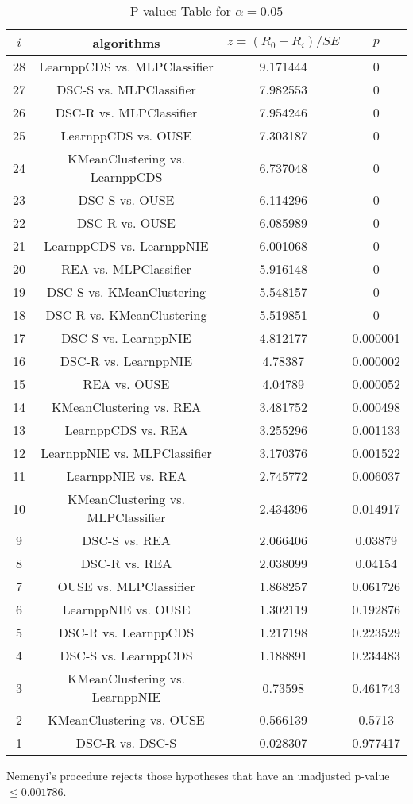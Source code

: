 \documentclass[a4paper,10pt]{article}
\begin{document}
\begin{landscape}
\begin{table}[!htp]
\centering\scriptsize
\begin{tabular}{cccc}
$i$&algorithms&$z=(R_0 - R_i)/SE$&$p$\\
\hline28&LearnppCDS vs. MLPClassifier&9.171444&0\\
27&DSC-S vs. MLPClassifier&7.982553&0\\
26&DSC-R vs. MLPClassifier&7.954246&0\\
25&LearnppCDS vs. OUSE&7.303187&0\\
24&KMeanClustering vs. LearnppCDS&6.737048&0\\
23&DSC-S vs. OUSE&6.114296&0\\
22&DSC-R vs. OUSE&6.085989&0\\
21&LearnppCDS vs. LearnppNIE&6.001068&0\\
20&REA vs. MLPClassifier&5.916148&0\\
19&DSC-S vs. KMeanClustering&5.548157&0\\
18&DSC-R vs. KMeanClustering&5.519851&0\\
17&DSC-S vs. LearnppNIE&4.812177&0.000001\\
16&DSC-R vs. LearnppNIE&4.78387&0.000002\\
15&REA vs. OUSE&4.04789&0.000052\\
14&KMeanClustering vs. REA&3.481752&0.000498\\
13&LearnppCDS vs. REA&3.255296&0.001133\\
12&LearnppNIE vs. MLPClassifier&3.170376&0.001522\\
11&LearnppNIE vs. REA&2.745772&0.006037\\
10&KMeanClustering vs. MLPClassifier&2.434396&0.014917\\
9&DSC-S vs. REA&2.066406&0.03879\\
8&DSC-R vs. REA&2.038099&0.04154\\
7&OUSE vs. MLPClassifier&1.868257&0.061726\\
6&LearnppNIE vs. OUSE&1.302119&0.192876\\
5&DSC-R vs. LearnppCDS&1.217198&0.223529\\
4&DSC-S vs. LearnppCDS&1.188891&0.234483\\
3&KMeanClustering vs. LearnppNIE&0.73598&0.461743\\
2&KMeanClustering vs. OUSE&0.566139&0.5713\\
1&DSC-R vs. DSC-S&0.028307&0.977417\\
\hline
\end{tabular}
\caption{P-values Table for $\alpha=0.05$}
\end{table}Nemenyi's procedure rejects those hypotheses that have an unadjusted p-value $\le0.001786$.


\end{landscape}
\end{document}
